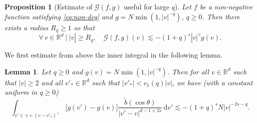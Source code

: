 \documentclass[JEP,XML,SOM,Unicode,NoFloatCountersInSection]{cedram}
\theoremstyle{plain}
\newtheorem{prop}[thm]{Proposition}
\newtheorem{lemma}[thm]{Lemma}
\theoremstyle{definition}
\numberwithin{equation}{section}
\newcommand{\R}{\mathbb R}
\newcommand{\dd} {\, \mathrm{d}}
\let\A N
\begin{document}

\begin{prop}[Estimate of {$\mathcal{G} (f,g)$} useful for large
$q$] \label{prop:G-bis} Let $f$ be a non-negative function satisfying \eqref{eq:non-deg} and
$g = \A \min(1,|v|^{-q})$, $q \ge 0$. Then there exists a radius
$R_q \geq 1$ so that
\[ \forall \, v \in \R^d \ | \ |v| \geq R_q, \quad
\mathcal{G}(f,g)(v) \lesssim - (1+q)^s |v|^{\gamma} g(v). \]
\end{prop}

We first estimate from above the inner integral in the following lemma.
\begin{lemma} \label{l:good-cone} Let $q \geq 0$ and
$g (v) = \A \min(1,|v|^{-q})$. Then for all $v \in \R^d$ such that
$|v| \ge 2$ and all $v'_* \in \R^d$ such that $|v'_*| < c_1(q)|v|$,
we have (with a constant uniform in $q \ge 0$)
\[
\int_{v'\in \, v + (v-v'_*)^\bot} \big[ g(v') - g(v)\big] \frac{\tilde
b(\cos \theta)}{|v'-v|^{d-1+2s}} \dd v' \lesssim - (1+q)^s \A
|v|^{-2s-q}.
\]
\end{lemma}
\end{document}
